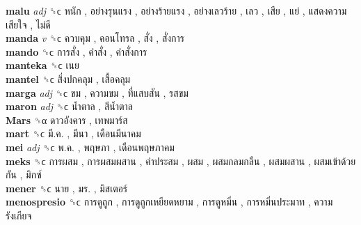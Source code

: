 \textbf{malu} \emph{adj}  ␝ϲ   หนัก ,  อย่างรุนแรง ,  อย่างร้ายแรง ,  อย่างเลวร้าย ,  เลว ,  เสีย ,  แย่ ,  แสดงความเสียใจ ,  ไม่ดี   \\
\textbf{manda} \emph{v}  ␝ϲ   ควบคุม ,  คอนโทรล ,  สั่ง ,  สั่งการ   \\
\textbf{mando} ␝ϲ   การสั่ง ,  คำสั่ง ,  คำสั่งการ   \\
\textbf{manteka} ␝ϲ   เนย   \\
\textbf{mantel} ␝ϲ   สิ่งปกคลุม ,  เสื้อคลุม   \\
\textbf{marga} \emph{adj}  ␝ϲ   ขม ,  ความขม ,  ที่แสบสัน ,  รสขม   \\
\textbf{maron} \emph{adj}  ␝ϲ   น้ำตาล ,  สีน้ำตาล   \\
\textbf{Mars} ␝α   ดาวอังคาร ,  เทพมาร์ส   \\
\textbf{mart} ␝ϲ   มี.ค. ,  มีนา ,  เดือนมีนาคม   \\
\textbf{mei} \emph{adj}  ␝ϲ   พ.ค. ,  พฤษภา ,  เดือนพฤษภาคม   \\
\textbf{meks} ␝ϲ   การผสม ,  การผสมผสาน ,  คำประสม ,  ผสม ,  ผสมกลมกลืน ,  ผสมผสาน ,  ผสมเข้าด้วยกัน ,  มิกซ์   \\
\textbf{mener} ␝ϲ   นาย ,  มร. ,  มิสเตอร์   \\
\textbf{menospresio} ␝ϲ   การดูถูก ,  การดูถูกเหยียดหยาม ,  การดูหมิ่น ,  การหมิ่นประมาท ,  ความรังเกียจ   \\
